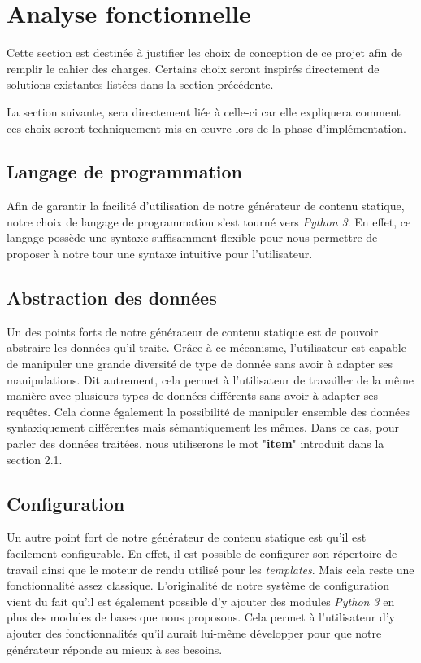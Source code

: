\section{Analyse fonctionnelle}

	Cette section est destinée à justifier les choix de conception de ce projet afin de remplir le cahier des charges. Certains choix seront inspirés directement de solutions existantes listées dans la section précédente.
	
	La section suivante, sera directement liée à celle-ci car elle expliquera comment ces choix seront techniquement mis en œuvre lors de la phase d'implémentation.

	\subsection{Langage de programmation}
		Afin de garantir la facilité d'utilisation de notre générateur de contenu statique, notre choix de langage de programmation s'est tourné vers \textit{Python 3}. En effet, ce langage possède une syntaxe suffisamment flexible pour nous permettre de proposer à notre tour une syntaxe intuitive pour l'utilisateur.
	
	\subsection{Abstraction des données}
		Un des points forts de notre générateur de contenu statique est de pouvoir abstraire les données qu'il traite. Grâce à ce mécanisme, l'utilisateur est capable de manipuler une grande diversité de type de donnée sans avoir à adapter ses manipulations. Dit autrement, cela permet à l'utilisateur de travailler de la même manière avec plusieurs types de données différents sans avoir à adapter ses requêtes. Cela donne également la possibilité de manipuler ensemble des données  syntaxiquement différentes mais sémantiquement les mêmes. Dans ce cas, pour parler des données traitées, nous utiliserons le mot "\textbf{item}" introduit dans la section 2.1.
		
	\subsection{Configuration}
		Un autre point fort de notre générateur de contenu statique est qu'il est facilement configurable. En effet, il est possible de configurer son répertoire de travail ainsi que le moteur de rendu utilisé pour les \textit{templates}. Mais cela reste une fonctionnalité assez classique. L'originalité de notre système de configuration vient du fait qu'il est également possible d'y ajouter des modules \textit{Python 3} en plus des modules de bases que nous proposons. Cela permet à l'utilisateur d'y ajouter des fonctionnalités qu'il aurait lui-même développer pour que notre générateur réponde au mieux à ses besoins.
		

